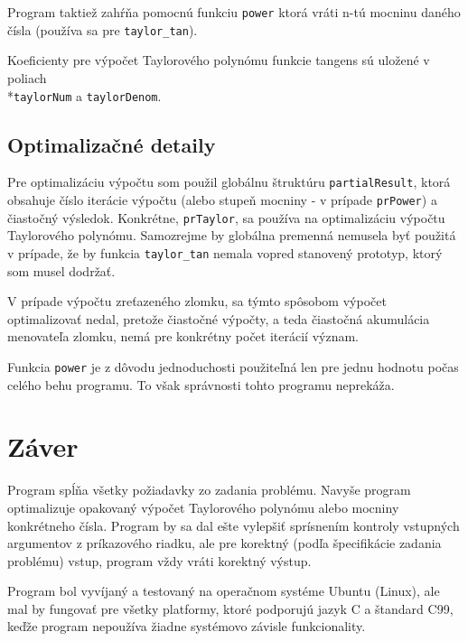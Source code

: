 \documentclass[12pt,a4paper,titlepage,final]{article}
\begin{document}
Program taktiež zahŕňa pomocnú funkciu \texttt{power} ktorá vráti n-tú mocninu daného čísla (používa sa pre \texttt{taylor\_tan}).

Koeficienty pre výpočet Taylorového polynómu funkcie tangens sú uložené v poliach 
\\*\texttt{taylorNum} a \texttt{taylorDenom}.

\subsection{Optimalizačné detaily}

Pre optimalizáciu výpočtu som použil globálnu štruktúru \texttt{partialResult}, ktorá obsahuje číslo iterácie výpočtu (alebo stupeň mocniny - v prípade \texttt{prPower}) a čiastočný výsledok. Konkrétne, \texttt{prTaylor}, sa používa na optimalizáciu výpočtu Taylorového polynómu. Samozrejme by globálna premenná nemusela byť použitá v prípade, že by funkcia \texttt{taylor\_tan} nemala vopred stanovený prototyp, ktorý som musel dodržať.

V prípade výpočtu zreťazeného zlomku, sa týmto spôsobom výpočet optimalizovať nedal, pretože čiastočné výpočty, a teda čiastočná akumulácia menovateľa zlomku, nemá pre konkrétny počet iterácií význam.

Funkcia \texttt{power} je z dôvodu jednoduchosti použiteľná len pre jednu hodnotu počas celého behu programu. To však správnosti tohto programu neprekáža.

\section{Záver} \label{zaver}

Program spĺňa všetky požiadavky zo zadania problému. Navyše program optimalizuje opakovaný výpočet Taylorového polynómu alebo mocniny konkrétneho čísla. Program by sa dal ešte vylepšiť sprísnením kontroly vstupných argumentov z príkazového riadku, ale pre korektný (podľa špecifikácie zadania problému) vstup, program vždy vráti korektný výstup. 

Program bol vyvíjaný a testovaný na operačnom systéme Ubuntu (Linux), ale mal by fungovať pre všetky platformy, ktoré podporujú jazyk C a štandard C99, keďže program nepoužíva žiadne systémovo závisle funkcionality.
\end{document}
